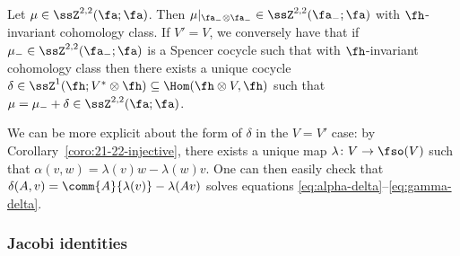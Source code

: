 \begin{Lemma}\label{lemma:invt-spencer-cocycle}
	Let $\mu\in\ssZ^{2,2}(\fa;\fa)$. Then $\mu|_{\fa_-\otimes\fa_-}\in\ssZ^{2,2}(\fa_-;\fa)$ with $\fh$-invariant cohomology class. If $V'=V$, we conversely have that if $\mu_-\in\ssZ^{2,2}(\fa_-;\fa)$ is a Spencer cocycle such that with $\fh$-invariant cohomology class then there exists a unique cocycle $\delta\in\ssZ^1(\fh;V^*\otimes\fh)\subseteq\Hom(\fh\otimes V,\fh)$ such that $\mu=\mu_-+\delta\in\ssZ^{2,2}(\fa;\fa)$.
\end{Lemma}

We can be more explicit about the form of $\delta$ in the $V=V'$ case: by Corollary~\ref{coro:21-22-injective}, there exists a unique map $\lambda\colon V\to\fso(V)$ such that
$\alpha(v,w) = \lambda(v)w - \lambda(w)v$.
One can then easily check that
$\delta(A,v) = \comm{A}{\lambda(v)} - \lambda(Av)
$
solves equations \eqref{eq:alpha-delta}--\eqref{eq:gamma-delta}.

\subsubsection{Jacobi identities}

